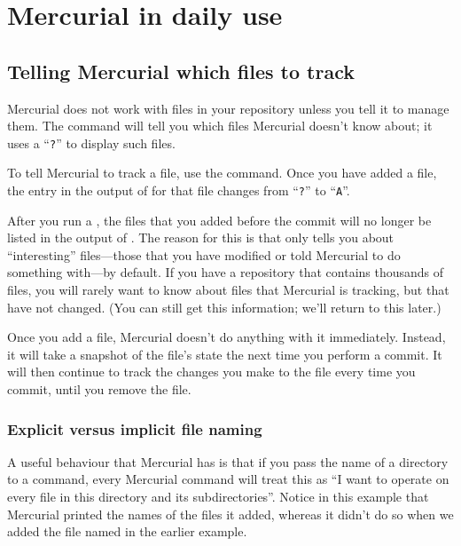 \chapter{Mercurial in daily use}
\label{chap:daily}

\section{Telling Mercurial which files to track}

Mercurial does not work with files in your repository unless you tell
it to manage them.  The  command will tell you which
files Mercurial doesn't know about; it uses a ``\texttt{?}'' to
display such files.

To tell Mercurial to track a file, use the  command.  Once
you have added a file, the entry in the output of  for
that file changes from ``\texttt{?}'' to ``\texttt{A}''.

After you run a , the files that you added before the
commit will no longer be listed in the output of .  The
reason for this is that  only tells you about
``interesting'' files---those that you have modified or told Mercurial
to do something with---by default.  If you have a repository that
contains thousands of files, you will rarely want to know about files
that Mercurial is tracking, but that have not changed.  (You can still
get this information; we'll return to this later.)

Once you add a file, Mercurial doesn't do anything with it
immediately.  Instead, it will take a snapshot of the file's state the
next time you perform a commit.  It will then continue to track the
changes you make to the file every time you commit, until you remove
the file.

\subsection{Explicit versus implicit file naming}

A useful behaviour that Mercurial has is that if you pass the name of
a directory to a command, every Mercurial command will treat this as
``I want to operate on every file in this directory and its
subdirectories''.
Notice in this example that Mercurial printed the names of the files
it added, whereas it didn't do so when we added the file named
 in the earlier example.

